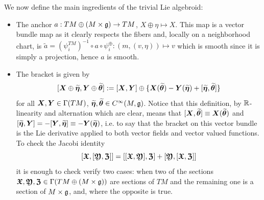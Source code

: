 We now define the main ingredients of the trivial Lie algebroid:
    \begin{itemize}
    \item The anchor $a: TM \oplus (M \times \mathfrak{g}) \to TM$, $X \oplus \eta \mapsto X$. This map is a vector bundle map as it clearly respects the fibers and, locally on a neighborhood chart, is $\tilde a = (\psi^{TM}_i)^{-1} \circ a \circ \psi^{\oplus}_i: (m, (v, \eta)) \mapsto v$ which is smooth since it is simply a projection, hence $a$ is smooth.
    
    \item The bracket is given by 
    \[
        [\bm{X} \oplus \widetilde{\bm{\eta}}, \bm{Y} \oplus \widetilde{\bm{\theta}}] := [\bm{X}, \bm{Y}] \oplus \{\bm{X}(\widetilde{\bm{\theta}}) - \bm{Y}(\widetilde{\bm{\eta}}) + [\widetilde{\bm{\eta}}, \widetilde{\bm{\theta}}]\}
    \]
    for all $\bm{X}, \bm{Y} \in \Gamma(TM)$, $\widetilde{\bm{\eta}}, \widetilde{\bm{\theta}} \in C^\infty(M, \mathfrak{g})$.%
    Notice that this definition, by $\mathbb{R}$-linearity and alternation which are clear, means that $[\bm{X}, \widetilde{\bm{\theta}}] \equiv \bm{X}(\widetilde{\bm{\theta}})$ and $[\widetilde{\bm{\eta}}, \bm{Y}] = - [\bm{Y}, \widetilde{\bm{\eta}}] \equiv -\bm{Y}(\widetilde{\bm{\eta}})$, i.e. to say that the bracket on this vector bundle is the Lie derivative applied to both vector fields and vector valued functions. %
    To check the Jacobi identity
    \[ [\bm{\mathfrak{X}}, [\bm{\mathfrak{Y}}, \bm{\mathfrak{Z}}]] = [[\bm{\mathfrak{X}}, \bm{\mathfrak{Y}}], \bm{\mathfrak{Z}}] + [\bm{\mathfrak{Y}}, [\bm{\mathfrak{X}}, \bm{\mathfrak{Z}}]] \] it is enough to check verify two cases: when two of the sections $\bm{\mathfrak{X}}, \bm{\mathfrak{Y}}, \bm{\mathfrak{Z}} \in \Gamma(TM \oplus (M \times \mathfrak{g}))$ are sections of $TM$ and the remaining one is a section of $M \times \mathfrak{g}$, and, where the opposite is true.
    \end{itemize}

